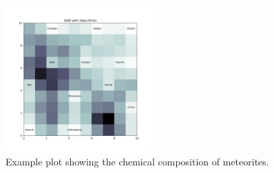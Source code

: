 \begin{figure}[H]
    \centering
    \includegraphics[width=0.5\textwidth]{figures/som_with_data_points.png}
    \caption{Example plot showing the chemical composition of meteorites.}
    \label{fig:SOM}
\end{figure}